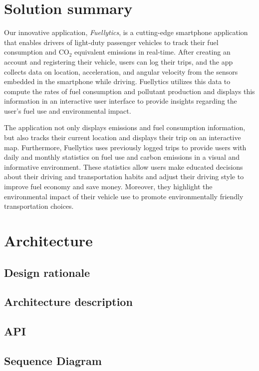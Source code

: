 \documentclass[11pt, oneside]{article}
\begin{document}
\section{Solution summary}

Our innovative application, \textit{Fuellytics}, is a cutting-edge smartphone application that enables drivers of light-duty passenger vehicles to track their fuel consumption and CO$_2$ equivalent emissions in real-time.  After creating an account and registering their vehicle, users can log their trips, and the app collects data on location, acceleration, and angular velocity from the sensors embedded in the smartphone while driving.  Fuellytics utilizes this data to compute the rates of fuel consumption and pollutant production and displays this information in an interactive user interface to provide insights regarding the user's fuel use and environmental impact. 

The application not only displays emissions and fuel consumption information, but also tracks their current location and displays their trip on an interactive map.  Furthermore, Fuellytics uses previously logged trips to provide users with daily and monthly statistics on fuel use and carbon emissions in a visual and informative environment.  These statistics allow users make educated decisions about their driving and transportation habits and adjust their driving style to improve fuel economy and save money.  Moreover, they highlight the environmental impact of their vehicle use to promote environmentally friendly transportation choices.

\section{Architecture}

\subsection{Design rationale}

\subsection{Architecture description}

\subsection{API}

\subsection{Sequence Diagram}
\end{document}
